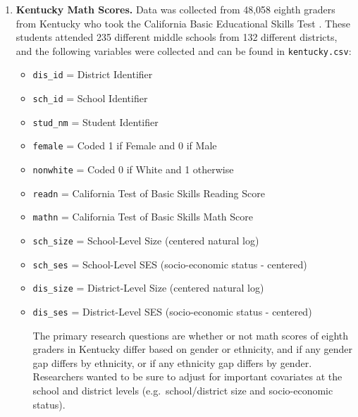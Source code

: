 \documentclass[
]{krantz}
\providecommand{\tightlist}{%
  \setlength{\itemsep}{0pt}\setlength{\parskip}{0pt}}
\begin{document}
\begin{enumerate}
\def\labelenumi{\arabic{enumi}.}
\tightlist
\item
  \textbf{Kentucky Math Scores.}
  Data was collected from 48,058 eighth graders from Kentucky who took the California Basic Educational Skills Test \citep{Bickel2007}. These students attended 235 different middle schools from 132 different districts, and the following variables were collected and can be found in \texttt{kentucky.csv}:

  \begin{itemize}
  \tightlist
  \item
    \texttt{dis\_id} = District Identifier\\
  \item
    \texttt{sch\_id} = School Identifier\\
  \item
    \texttt{stud\_nm} = Student Identifier\\
  \item
    \texttt{female} = Coded 1 if Female and 0 if Male\\
  \item
    \texttt{nonwhite} = Coded 0 if White and 1 otherwise\\
  \item
    \texttt{readn} = California Test of Basic Skills Reading Score\\
  \item
    \texttt{mathn} = California Test of Basic Skills Math Score\\
  \item
    \texttt{sch\_size} = School-Level Size (centered natural log)\\
  \item
    \texttt{sch\_ses} = School-Level SES (socio-economic status - centered)\\
  \item
    \texttt{dis\_size} = District-Level Size (centered natural log)\\
  \item
    \texttt{dis\_ses} = District-Level SES (socio-economic status - centered)

    The primary research questions are whether or not math scores of eighth graders in Kentucky differ
    based on gender or ethnicity, and if any gender gap differs by ethnicity, or if any ethnicity gap
    differs by gender. Researchers wanted to be sure to adjust for important covariates at the school
    and district levels (e.g.~school/district size and socio-economic status).\\
  \end{itemize}


\end{enumerate}
\end{document}
